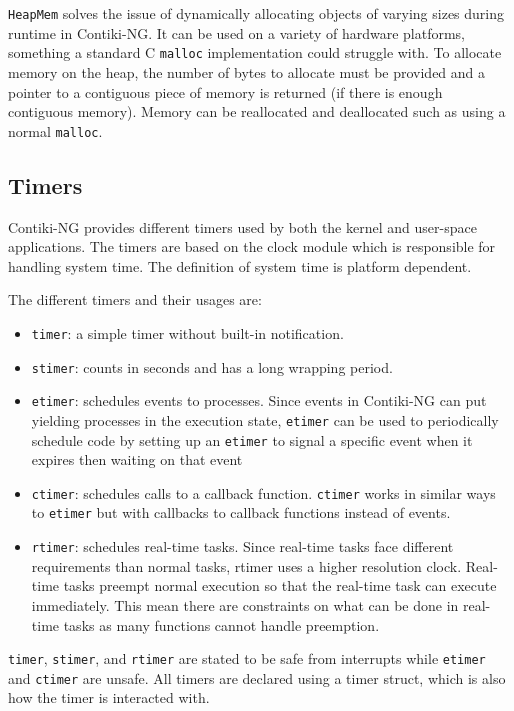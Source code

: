 \documentclass[0-thesis.tex]{subfiles}
\begin{document}
\texttt{HeapMem} solves the issue of dynamically allocating objects of varying sizes
during runtime in Contiki-NG. It can be used on a variety of hardware platforms, something
a standard C \texttt{malloc} implementation could struggle with. To allocate memory on the
heap, the number of bytes to allocate must be provided and a pointer to a contiguous piece
of memory is returned (if there is enough contiguous memory). Memory can be reallocated
and deallocated such as using a normal \texttt{malloc}.

\subsection{Timers}
\label{ssec:timers}
Contiki-NG provides different timers used by both the kernel and user-space applications.
The timers are based on the clock module which is responsible for handling system time.
The definition of system time is platform dependent.

The different timers and their usages are:
\begin{itemize}
    \item \texttt{timer}: a simple timer without built-in notification.
    \item \texttt{stimer}: counts in seconds and has a long wrapping period.
    \item \texttt{etimer}: schedules events to processes. Since events in Contiki-NG
            can put yielding processes in the execution state, \texttt{etimer} can be
            used to periodically schedule code by setting up an \texttt{etimer} to
            signal a specific event when it expires then waiting on that event
    \item \texttt{ctimer}: schedules calls to a callback function. \texttt{ctimer}
            works in similar ways to \texttt{etimer} but with callbacks to callback
            functions instead of events.
    \item \texttt{rtimer}: schedules real-time tasks. Since real-time tasks face
            different requirements than normal tasks, rtimer uses a higher resolution
            clock. Real-time tasks preempt normal execution so that the real-time task can
            execute immediately. This mean there are constraints on what can be done in
            real-time tasks as many functions cannot handle preemption.
\end{itemize}

\texttt{timer}, \texttt{stimer}, and \texttt{rtimer} are stated to be safe from interrupts
while \texttt{etimer} and \texttt{ctimer} are unsafe. All timers are declared using a
timer struct, which is also how the timer is interacted with.
\end{document}
